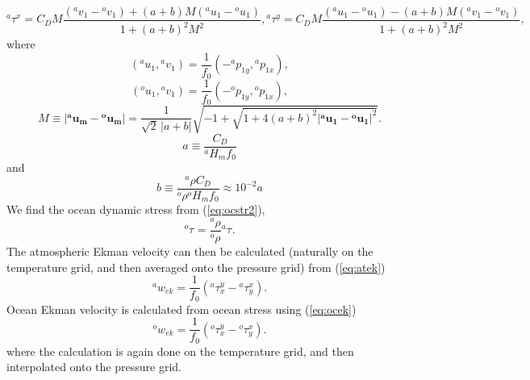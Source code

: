 \documentclass[11pt, a4paper,twoside]{article}
\newcommand{\rhb}[1]{{{}^{#1}\rho}}
\newcommand{\p}[2]{{{}^{#1}p_{#2}}}
\newcommand{\uu}[2]{{{}^{#1}u_{#2}}}
\newcommand{\vv}[2]{{{}^{#1}v_{#2}}}
\newcommand{\ek}[1]{{{}^{#1}w_{ek}}}
\newcommand{\HH}[2]{{{}^{#1}H_{#2}}}
\newcommand{\tx}[2]{{}^{#1}\tau^{#2}}
\newcommand{\vc}[1]{\mathbf{#1}}
\numberwithin{equation}{section}
\begin{document}
\begin{subequations}
\begin{equation}\label{eq:stress5}
\tx{a}{x}  =  C_D M \frac{(\vv{a}{1} - \vv{o}{1}) + (a + b) M (\uu{a}{1} - \uu{o}{1}) }{1 +  (a + b)^2 M^2},
\end{equation}
\begin{equation}\label{eq:veldif5}
\tx{a}{y} =  C_D M \frac{(\uu{a}{1} - \uu{o}{1}) - (a + b) M  (\vv{a}{1} - \vv{o}{1})} {1 +  (a + b)^2 M^2},
\end{equation}
\end{subequations}
where
\begin{equation}
( \uu{a}{1}, \vv{a}{1}) = \frac{1}{f_0} \left( - \p{a}{1y} ,\p{a}{1x}\right),
\end{equation}
\begin{equation}
( \uu{o}{1}, \vv{o}{1}) = \frac{1}{f_0} \left( - \p{o}{1y} ,\p{o}{1x}\right),
\end{equation}
\begin{equation}
M \equiv \lvert \vc{\uu{a}{m}} - \vc{\uu{o}{m}} \rvert = \frac{1 }{\sqrt{2}\, \lvert a +b \rvert} \sqrt{-1 +\sqrt{1 + 4 (a+b)^2 \lvert \vc{\uu{a}{1}} - \vc{\uu{o}{1}} \rvert ^2}}.
\end{equation}
\[a \equiv \frac{C_D}{\HH{a}{m}f_0}\]
and
\[b \equiv \frac{\rhb{a}C_D}{\rhb{o}\HH{o}{m}f_0} \approx 10^{-2}a\]
We find the ocean dynamic stress from (\ref{eq:ocstr2}), 
\begin{equation}\label{eq:ocstr1}
\tx{o}{} = \frac{\rhb{a}}{\rhb{o}}\tx{a}{}.
\end{equation}
The atmospheric Ekman velocity can then be calculated (naturally on the temperature grid, and then averaged onto the pressure grid) from (\ref{eq:atek}) 
\begin{equation}\label{eq:atek1}
\ek{a} = \frac{1}{f_0}(\tx{a}{y}_x  - \tx{a}{x}_y).
\end{equation}
Ocean Ekman velocity is calculated from ocean stress using (\ref{eq:ocek})
\begin{equation}\label{eq:ocek1}
\ek{o} = \frac{1}{f_0}(\tx{o}{y}_x  - \tx{o}{x}_y).
\end{equation}
where the calculation is again done on the temperature grid, and then interpolated onto the pressure grid.
\end{document}
